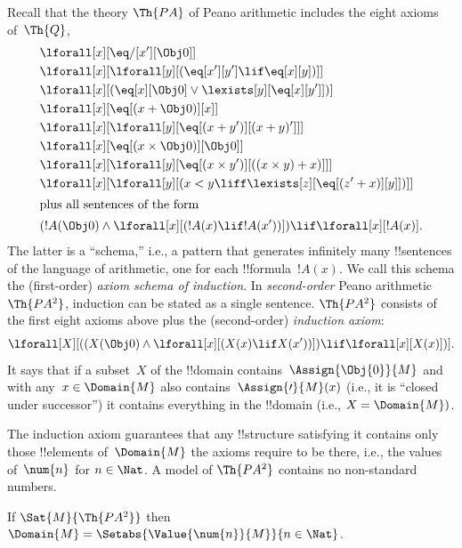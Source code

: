 \documentclass[../../../include/open-logic-section]{subfiles}
\begin{document}


Recall that the theory $\Th{PA}$ of Peano arithmetic includes the
eight axioms of~$\Th{Q}$,
\begin{align*}
& \lforall[x][\eq/[x'][\Obj 0]]\\
& \lforall[x][\lforall[y][(\eq[x'][y'] \lif \eq[x][y])]]\\
& \lforall[x][(\eq[x][\Obj 0] \lor \lexists[y][\eq[x][y']])]\\ 
& \lforall[x][\eq[(x + \Obj 0)][x]]\\
& \lforall[x][\lforall[y][\eq[(x + y')][(x + y)']]]\\
& \lforall[x][\eq[(x \times \Obj 0)][\Obj 0]]\\
& \lforall[x][\lforall[y][\eq[(x \times y')][((x \times y) + x)]]]\\
& \lforall[x][\lforall[y][(x < y \liff \lexists[z][\eq[(z' + x)][y]])]]\\
\intertext{plus all sentences of the form}
& (!A(\Obj 0) \land \lforall[x][(!A(x) \lif !A(x'))]) \lif \lforall[x][!A(x)].
\end{align*}
The latter is a ``schema,'' i.e., a pattern that generates infinitely
many !!{sentence}s of the language of arithmetic, one for each
!!{formula}~$!A(x)$. We call this schema the (first-order)
\emph{axiom schema of induction}. 
In \emph{second-order} Peano arithmetic~$\Th{PA^2}$, induction
can be stated as a single sentence. $\Th{PA^2}$
consists of the first eight axioms above plus the (second-order)
\emph{induction axiom}:
\[
\lforall[X][((X(\Obj 0) \land \lforall[x][(X(x) \lif X(x'))]) \lif \lforall[x][X(x)])].
\]
It says that if a subset~$X$ of the !!{domain}
contains~$\Assign{\Obj{0}}{M}$ and with any~$x \in \Domain{M}$ also
contains~$\Assign{\prime}{M}(x)$ (i.e., it is ``closed under
successor'') it contains everything in the !!{domain} (i.e., $X =
\Domain{M})$.

The induction axiom guarantees that any !!{structure} satisfying it
contains only those !!{element}s of~$\Domain{M}$ the axioms require to
be there, i.e., the values of~$\num{n}$ for $n \in \Nat$. A model of
$\Th{PA^2}$ contains no non-standard numbers.

\begin{thm}
If $\Sat{M}{\Th{PA^2}}$ then $\Domain{M} =
\Setabs{\Value{\num{n}}{M}}{n \in \Nat}$.
\end{thm}
\end{document}
